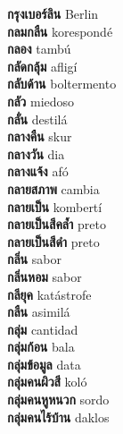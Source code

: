 \textbf{ กรุงเบอร์ลิน  } Berlin \\
\textbf{ กลมกลืน  } korespondé \\
\textbf{ กลอง  } tambú \\
\textbf{ กลัดกลุ้ม  } afligí \\
\textbf{ กลับด้าน  } boltermento \\
\textbf{ กลัว  } miedoso \\
\textbf{ กลั่น  } destilá \\
\textbf{ กลางคืน  } skur \\
\textbf{ กลางวัน  } dia \\
\textbf{ กลางแจ้ง  } afó \\
\textbf{ กลายสภาพ  } cambia \\
\textbf{ กลายเป็น  } kombertí \\
\textbf{ กลายเป็นสีคล้ำ  } preto \\
\textbf{ กลายเป็นสีดำ  } preto \\
\textbf{ กลิ่น  } sabor \\
\textbf{ กลิ่นหอม  } sabor \\
\textbf{ กลียุค  } katástrofe \\
\textbf{ กลืน  } asimilá \\
\textbf{ กลุ่ม  } cantidad \\
\textbf{ กลุ่มก้อน  } bala \\
\textbf{ กลุ่มข้อมูล  } data \\
\textbf{ กลุ่มคนผิวสี  } koló \\
\textbf{ กลุ่มคนหูหนวก  } sordo \\
\textbf{ กลุ่มคนไร้บ้าน  } daklos \\
